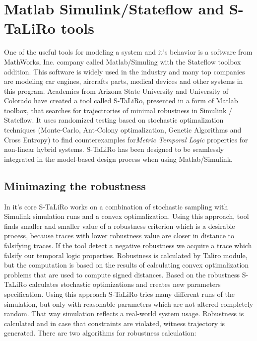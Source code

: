 \documentclass[english,technical,10pt]{FITreport}[2018/01/26]
\begin{document}
\section{Matlab Simulink/Stateflow and S-TaLiRo tools}

One of the useful tools for modeling a system and it's behavior is a software from MathWorks, Inc. company called Matlab/Simuling with the Stateflow toolbox addition. This software is widely used in the industry and many top companies are modeling car engines, aircrafts parts, medical devices and other systems in this program. Academics from Arizona State University and University of Colorado have created a tool called S-TaLiRo, presented in a form of Matlab toolbox, that searches for trajectrories of minimal robustness in Simulink / Stateflow.  It uses randomized testing based on stochastic optimalization techniques (Monte-Carlo, Ant-Colony optimalization, Genetic Algorithms and Cross Entropy) to find counterexamples for\textit{Metric Temporal Logic} \cite{Koymans:1990} properties for non-linear hybrid systems. S-TaLiRo has been designed to be seamlessly integrated in the model-based design process when using Matlab/Simulink.

\subsection{Minimazing the robustness}

In it's core S-TaLiRo works on a combination of stochastic sampling with Simulink simulation runs and a convex optimalization. Using this approach, tool finds smaller and smaller value of a robustness criterion which is a desirable process, because traces with lower robustness value are closer in distance to falsifying traces. If the tool detect a negative robustness we acquire a trace which falsify our temporal logic properties. Robustness is calculated by Taliro module, but the computation is based on the results of calculating convex optimalization problems that are used to compute signed distances. Based on the robustness S-TaLiRo calculates stochastic optimizations and creates new parameters specification. Using this approach S-TaLiRo tries many different runs of the simulation, but only with reasonable parameters which are not altered completely random. That way simulation reflects a real-world system usage. Robustness is calculated and in case that constraints are violated, witness trajectory is generated. There are two algorithms for robustness calculation:
\end{document}
